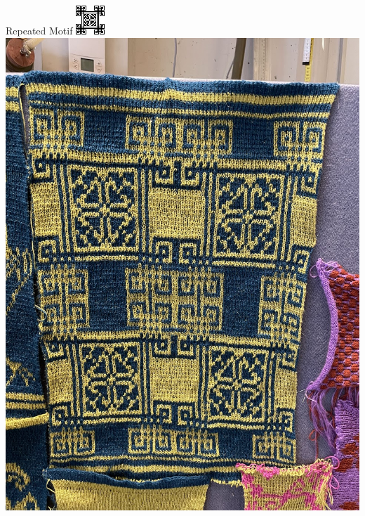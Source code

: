 \documentclass[
    NAME={Dr. Helga Ingimundardóttir},
    EMAIL={helgaingim@hi.is},
    FACULTY={Industrial Engineering},
    TITLE={HiDef Textiles: Reviving Tradition with Innovation},
    SUBTITLE={Empowering Creativity and Sustainability in Textile Production through Digital Transformation},
    SEMINAR={Reykjavík DataBeers},
    DATE={January 25, 2025},
    WIDE={true}
]{HI-LaTeX/hi-beamer}
\begin{document}
    \begin{frame}{Repeated Motif}
        \centering
        \includegraphics[height=.7\textheight]{include/thjms5898_268.png}
        \hspace{24pt}
        \includegraphics[height=.7\textheight]{include/repeat.jpg}
    \end{frame}
\end{document}
